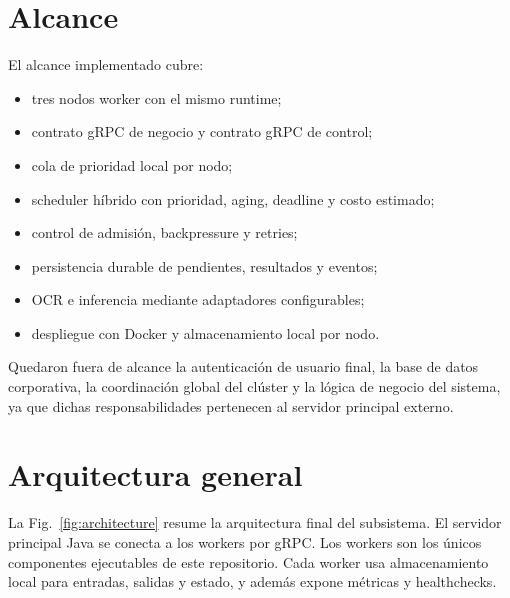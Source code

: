 \documentclass[conference]{IEEEtran}
\begin{document}
\section{Alcance}
El alcance implementado cubre:
\begin{itemize}[leftmargin=*]
\item tres nodos worker con el mismo runtime;
\item contrato gRPC de negocio y contrato gRPC de control;
\item cola de prioridad local por nodo;
\item scheduler híbrido con prioridad, aging, deadline y costo estimado;
\item control de admisión, backpressure y retries;
\item persistencia durable de pendientes, resultados y eventos;
\item OCR e inferencia mediante adaptadores configurables;
\item despliegue con Docker y almacenamiento local por nodo.
\end{itemize}

Quedaron fuera de alcance la autenticación de usuario final, la base de datos corporativa, la coordinación global del clúster y la lógica de negocio del sistema, ya que dichas responsabilidades pertenecen al servidor principal externo.

\section{Arquitectura general}
La Fig.~\ref{fig:architecture} resume la arquitectura final del subsistema. El servidor principal Java se conecta a los workers por gRPC. Los workers son los únicos componentes ejecutables de este repositorio. Cada worker usa almacenamiento local para entradas, salidas y estado, y además expone métricas y healthchecks.
\end{document}
